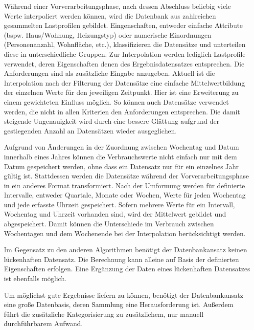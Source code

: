Während einer Vorverarbeitungsphase, nach dessen Abschluss beliebig viele Werte interpoliert werden können, wird die Datenbank aus zahlreichen gesammelten Lastprofilen gebildet. Eingenschaften, entweder einfache Attribute (bspw. Haus/Wohnung, Heizungstyp) oder numerische Einordnungen (Personenanzahl, Wohnfläche, etc.), klassifizieren die Datensätze und unterteilen diese in unterschiedliche Gruppen.
Zur Interpolation werden lediglich Lastprofile verwendet, deren Eigenschaften denen des Ergebnisdatensatzes entsprechen. Die Anforderungen sind als zusätzliche Eingabe anzugeben.
Aktuell ist die Interpolation nach der Filterung der Datensätze eine einfache Mittelwertbildung der einzelnen Werte für den jeweiligen Zeitpunkt. Hier ist eine Erweiterung zu einem gewichteten Einfluss möglich. So können auch Datensätze verwendet werden, die nicht in allen Kriterien den Anforderungen entsprechen. Die damit steigende Ungenauigkeit wird durch eine bessere Glättung aufgrund der gestiegenden Anzahl an Datensätzen wieder ausgeglichen.

Aufgrund von Änderungen in der Zuordnung zwischen Wochentag und Datum innerhalb eines Jahres können die Verbrauchswerte nicht einfach nur mit dem Datum gespeichert werden, ohne dass ein Datensatz nur für ein einzelnes Jahr gültig ist. Stattdessen werden die Datensätze während der Vorverarbeitungsphase in ein anderes Format transformiert. Nach der Umformung werden für definierte Intervalle, entweder Quartale, Monate oder Wochen, Werte für jeden Wochentag und jede erfasste Uhrzeit gespeichert. Sofern mehrere Werte für ein Intervall, Wochentag und Uhrzeit vorhanden sind, wird der Mittelwert gebildet und abgespeichert. Damit können die Unterschiede im Verbrauch zwischen Wochentagen und dem Wochenende bei der Interpolation berücksichtigt werden.

Im Gegensatz zu den anderen Algorithmen benötigt der Datenbankansatz keinen lückenhaften Datensatz. Die Berechnung kann alleine auf Basis der definierten Eigenschaften erfolgen. Eine Ergänzung der Daten eines lückenhaften Datensatzes ist ebenfalls möglich.

Um möglichst gute Ergebnisse liefern zu können, benötigt der Datenbankansatz eine große Datenbasis, deren Sammlung eine Herausforderung ist. Außerdem führt die zusätzliche Kategorisierung zu zusätzlichem, nur manuell durchführbarem Aufwand.